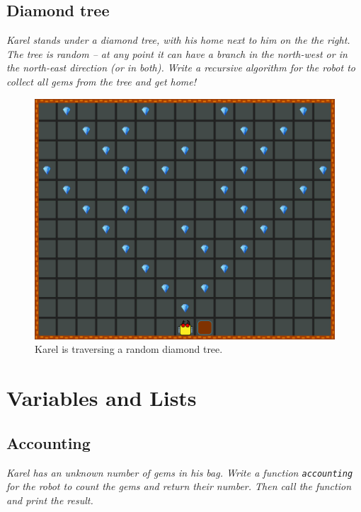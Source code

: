 {{\subsection{Diamond tree}

{\em Karel stands under a diamond tree, with his home next to him on the the right. 
The tree is random -- at any point it can have 
a branch in the north-west or in the north-east direction (or in both). Write a recursive 
algorithm for the robot to collect all gems from the tree and get home!  }

\begin{figure}[!ht]
\begin{center}
\includegraphics[height=0.4\textwidth]{img/g04.png}
\end{center}
\vspace{-4mm}
\caption{Karel is traversing a random diamond tree.}
\label{fig:g04}
\vspace{-10mm}
\end{figure}


\section{Variables and Lists}

\subsection{Accounting}

{\em Karel has an unknown number of gems in his bag. Write a function {\tt accounting} for the 
robot to count the gems and return their number. Then call the function and print the result.}

\newpage

}}
